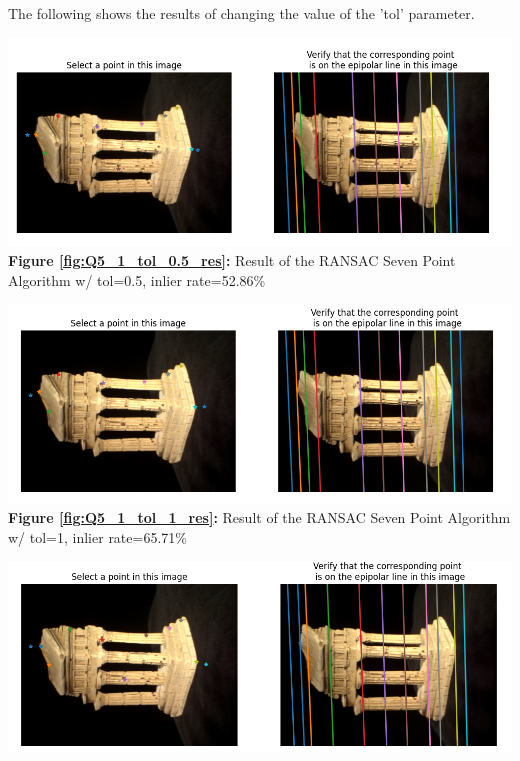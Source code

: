 \newpage
\begin{your_solution}[title=Q5.1 continued, height=22.5cm,width=\linewidth]
The following shows the results of changing the value of the 'tol' parameter.
\newline

\begin{minipage}{1\linewidth}
	\centering
	\includegraphics[width=1\linewidth, height=0.39\columnwidth]{../Q5_1_ransac_seven_tol_0.5_result.png}
	\textbf{Figure \ref{fig:Q5_1_tol_0.5_res}:} Result of the RANSAC Seven Point Algorithm w/ tol=0.5, inlier rate=52.86\% %
	\label{fig:Q5_1_tol_0.5_res}         %
\end{minipage}
\hfill
\begin{minipage}{1\linewidth}
	\centering
	\includegraphics[width=1\linewidth, height=0.39\columnwidth]{../Q5_1_ransac_seven_tol_1_result.png}
	\textbf{Figure \ref{fig:Q5_1_tol_1_res}:} Result of the RANSAC Seven Point Algorithm w/ tol=1, inlier rate=65.71\% %
	\label{fig:Q5_1_tol_1_res}         %
\end{minipage}
\hfill
\begin{minipage}{1\linewidth}
	\centering
	\includegraphics[width=1\linewidth, height=0.39\columnwidth]{../Q5_1_ransac_seven_tol_4_result.png}

\end{minipage}
\end{your_solution}
